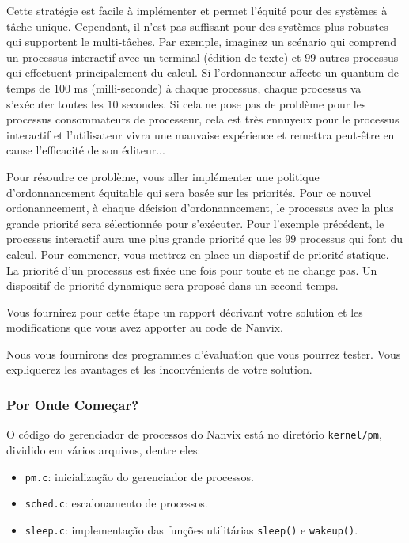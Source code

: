 \documentclass[11pt]{article}
\newif\ifbr
\begin{document}
		Cette stratégie est facile à implémenter et permet l'équité pour
		des systèmes à tâche unique. Cependant, il n'est pas suffisant
		pour des systèmes plus robustes qui supportent le multi-tâches.
		Par exemple, imaginez un scénario qui comprend un processus
		interactif avec un terminal (édition de texte) et $99$ autres processus
		qui effectuent principalement du calcul. Si l'ordonnanceur affecte un quantum
		de temps de $100$ ms (milli-seconde) à chaque processus, chaque processus
		va s'exécuter toutes les $10$ secondes. Si cela ne pose pas de problème
		pour les processus consommateurs de processeur, cela est très ennuyeux
		pour le processus interactif et l'utilisateur vivra une mauvaise
		expérience et remettra peut-être en cause l'efficacité de son éditeur...

		Pour résoudre ce problème, vous aller implémenter une politique
		d'ordonnancement équitable qui sera basée sur les priorités. Pour ce
		nouvel ordonanncement, à chaque décision d'ordonanncement, le
		processus avec la plus grande priorité sera sélectionnée pour
		s'exécuter. Pour l'exemple précédent, le processus interactif aura une
		plus grande priorité que les $99$ processus qui font du calcul. Pour
		commener, vous mettrez en place un dispostif de priorité statique. La
		priorité d'un processus est fixée une fois pour toute et ne change
		pas. Un dispositif de priorité dynamique sera proposé dans un second
		temps.

		Vous fournirez pour cette étape un rapport décrivant votre solution
		et les modifications que vous avez apporter au code de Nanvix.

		Nous vous fournirons des programmes d'évaluation que vous pourrez
		tester. Vous expliquerez les avantages et les inconvénients de votre
		solution.
\fi\fi\fi

\ifbr
	\subsubsection*{Por Onde Começar?}

		O código do gerenciador de processos do Nanvix está no diretório
		\texttt{kernel/pm}, dividido em vários arquivos, dentre eles:

		\begin{itemize}
			\item \texttt{pm.c}: inicialização do gerenciador de processos.
			\item \texttt{sched.c}: escalonamento de processos.
			\item \texttt{sleep.c}: implementação das funções utilitárias \texttt{sleep()} e \texttt{wakeup()}.
		\end{itemize}
\end{document}
